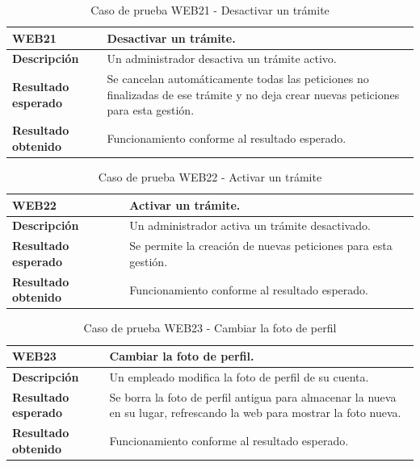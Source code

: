     \begin{table}[H]
        \centering
        \begin{tabular}{|l|p{12cm}|}
        \hline
        \textbf{WEB21} & Desactivar un trámite. \\ \hline
        \textbf{Descripción} & Un administrador desactiva un trámite activo. \\ \hline
        \textbf{Resultado esperado} & Se cancelan automáticamente todas las peticiones no finalizadas de ese trámite y no deja crear nuevas peticiones para esta gestión. \\ \hline
        \textbf{Resultado obtenido} & Funcionamiento conforme al resultado esperado. \\ \hline
        \end{tabular}
        \caption{Caso de prueba WEB21 - Desactivar un trámite}
    \end{table}

    \begin{table}[H]
        \centering
        \begin{tabular}{|l|p{12cm}|}
        \hline
        \textbf{WEB22} & Activar un trámite. \\ \hline
        \textbf{Descripción} & Un administrador activa un trámite desactivado. \\ \hline
        \textbf{Resultado esperado} & Se permite la creación de nuevas peticiones para esta gestión. \\ \hline
        \textbf{Resultado obtenido} & Funcionamiento conforme al resultado esperado. \\ \hline
        \end{tabular}
        \caption{Caso de prueba WEB22 - Activar un trámite}
    \end{table}

    \begin{table}[H]
        \centering
        \begin{tabular}{|l|p{12cm}|}
        \hline
        \textbf{WEB23} & Cambiar la foto de perfil. \\ \hline
        \textbf{Descripción} & Un empleado modifica la foto de perfil de su cuenta. \\ \hline
        \textbf{Resultado esperado} & Se borra la foto de perfil antigua para almacenar la nueva en su lugar, refrescando la web para mostrar la foto nueva.  \\ \hline
        \textbf{Resultado obtenido} & Funcionamiento conforme al resultado esperado. \\ \hline
        \end{tabular}
        \caption{Caso de prueba WEB23 - Cambiar la foto de perfil}
    \end{table}

